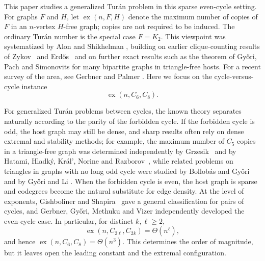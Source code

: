 \documentclass[11pt,letterpaper]{article}
\newcommand{\ex}{\operatorname{ex}}
\begin{document}
This paper studies a generalized Tur\'an problem in this sparse even-cycle setting. For graphs $F$ and $H$, let $\ex(n,F,H)$ denote the maximum number of copies of $F$ in an $n$-vertex $H$-free graph; copies are not required to be induced. The ordinary Tur\'an number is the special case $F=K_2$. This viewpoint was systematized by Alon and Shikhelman \cite{AlonShikhelman2016}, building on earlier clique-counting results of Zykov~\cite{Zykov1949} and Erd\H{o}s~\cite{Erdos1962} and on further exact results such as the theorem of Gy\H{o}ri, Pach and Simonovits \cite{GyoriPachSimonovits1991} for many bipartite graphs in triangle-free hosts. For a recent survey of the area, see Gerbner and Palmer \cite{GerbnerPalmerSurvey2026}. Here we focus on the cycle-versus-cycle instance
\[
  \ex(n,C_6,C_8).
\]

For generalized Tur\'an problems between cycles, the known theory separates naturally according to the parity of the forbidden cycle. If the forbidden cycle is odd, the host graph may still be dense, and sharp results often rely on dense extremal and stability methods; for example, the maximum number of $C_5$ copies in a triangle-free graph was determined independently by Grzesik~\cite{Grzesik2012} and by Hatami, Hladk\'y, Kr\'al', Norine and Razborov~\cite{HatamiEtAl2013}, while related problems on triangles in graphs with no long odd cycle were studied by Bollob\'as and Gy\H{o}ri~\cite{BollobasGyori2008} and by Gy\H{o}ri and Li \cite{GyoriLi2012}. When the forbidden cycle is even, the host graph is sparse and codegrees become the natural substitute for edge density. At the level of exponents, Gishboliner and Shapira~\cite{GishbolinerShapira2020} gave a general classification for pairs of cycles, and Gerbner, Gy\H{o}ri, Methuku and Vizer \cite{GerbnerGyoriMethukuVizer2020} independently developed the even-cycle case. In particular, for distinct $k,\ell\ge 2$,
\[
  \ex(n,C_{2\ell},C_{2k})=\Theta(n^\ell),
\]
and hence $\ex(n,C_6,C_8)=\Theta(n^3)$. This determines the order of magnitude, but it leaves open the leading constant and the extremal configuration.
\end{document}

